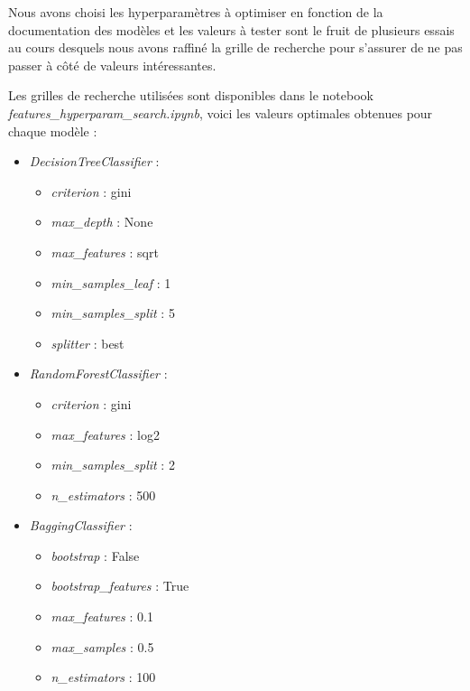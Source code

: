 \documentclass{article}
\begin{document}
Nous avons choisi les hyperparamètres à optimiser en fonction de la documentation des modèles
et les valeurs à tester sont le fruit de plusieurs essais au cours desquels nous avons
raffiné la grille de recherche pour s'assurer de ne pas passer à côté de valeurs intéressantes.

Les grilles de recherche utilisées sont disponibles dans le notebook \\
\textit{features\_hyperparam\_search.ipynb}, voici les valeurs optimales obtenues pour
chaque modèle :

\begin{footnotesize}
\begin{multicols}{2}
\begin{itemize}
    \item \textit{DecisionTreeClassifier} :
    \begin{itemize}
        \item \textit{criterion} : gini
        \item \textit{max\_depth} : None
        \item \textit{max\_features} : sqrt
        \item \textit{min\_samples\_leaf} : 1
        \item \textit{min\_samples\_split} : 5
        \item \textit{splitter} : best
    \end{itemize}
    \item \textit{RandomForestClassifier} :
    \begin{itemize}
        \item \textit{criterion} : gini
        \item \textit{max\_features} : log2
        \item \textit{min\_samples\_split} : 2
        \item \textit{n\_estimators} : 500
    \end{itemize}
    \item \textit{BaggingClassifier} :
    \begin{itemize}
        \item \textit{bootstrap} : False
        \item \textit{bootstrap\_features} : True
        \item \textit{max\_features} : 0.1
        \item \textit{max\_samples} : 0.5
        \item \textit{n\_estimators} : 100
    \end{itemize}

\end{itemize}
\end{multicols}
\end{footnotesize}
\end{document}
